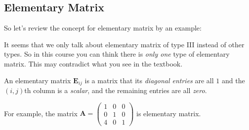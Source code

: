 \subsection{Elementary Matrix}
So let’s review the concept for elementary matrix by an example:
\begin{remark}
It seems that we only talk about elementary matrix of type III instead of other types. So in
this course you can think there is \emph{only one} type of elementary matrix. This may contradict what
you see in the textbook.
\end{remark}
\begin{definition}
An elementary matrix $\bm E_{ij}$ is a matrix that its \textit{diagonal entries} are all $1$ and the $(i,j)$th column is a \textit{scalar}, and the remaining entries are all \textit{zero}.
\end{definition}
For example, the matrix $\bm A=\begin{pmatrix}
1&0&0\\0&1&0\\4&0&1
\end{pmatrix}$ is elementary matrix.
